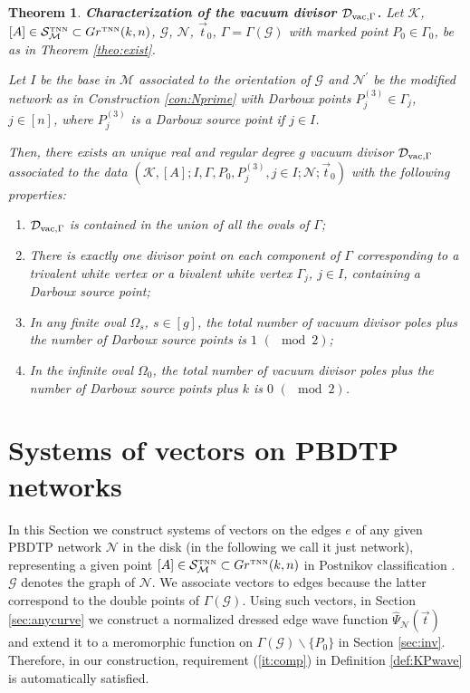 \documentclass[11pt]{amsart}
\theoremstyle{plain}
\numberwithin{equation}{section}
\newtheorem{theorem}{Theorem}[subsection]
\def \GTNN {{Gr^{\mbox{\tiny TNN}} (k,n)}}
\def \DVG {{\mathcal D}_{\textup{\scriptsize vac},\Gamma}}
\def \S {{\mathcal S}_{\mathcal M}^{\mbox{\tiny TNN}}}
\begin{document}
\begin{theorem}\label{theo:vac_div}\textbf{Characterization of the vacuum divisor $\DVG$.} 
Let ${\mathcal K}$, $[A]\in \S\subset \GTNN$, $\mathcal G$, $\mathcal N$, $\vec t_0$, $\Gamma=\Gamma(\mathcal G)$ with marked point $P_0\in \Gamma_0$, be as in Theorem \ref{theo:exist}. 

Let $I$ be the base in $\mathcal M$ associated to the orientation of $\mathcal G$ and $\mathcal N^{\prime}$ be the modified network as in Construction \ref{con:Nprime} with Darboux points $P^{(3)}_j\in \Gamma_j$, $j\in [n]$, where $P^{(3)}_j$ is a Darboux source point if $j\in I$.

Then, there exists an unique real and regular degree $g$ vacuum divisor $\DVG$ associated to the data $({\mathcal K}, [A]; I, \Gamma, P_0, P^{(3)}_{j}, j\in I ; {\mathcal N}; \vec t_0 )$ with the following properties:
\begin{enumerate}
\item $\DVG$ is contained in the union of all the ovals of $\Gamma$; 
\item There is exactly one divisor point on each component of $\Gamma$ corresponding to a trivalent white vertex or a bivalent white vertex $\Gamma_j$, $j\in I$, containing a Darboux source point; 
\item\label{item:defodd} In any finite oval $\Omega_s$, $s\in [g]$, the total number of vacuum divisor poles plus the number of Darboux source points is $1 \,\, (\!\!\!\!\mod 2)$;
\item\label{item:defeven} In the infinite oval $\Omega_0$, the total number of vacuum divisor poles plus the number of Darboux source points plus $k$ is $0 \,\, (\!\!\!\!\mod 2)$.
\end{enumerate}
\end{theorem}

\section{Systems of vectors on PBDTP networks}\label{sec:vectors}

In this Section we construct systems of vectors on the edges $e$ of any given PBDTP network ${\mathcal N}$ in the disk (in the following we call it just network), representing 
a given point $[A]\in{\mathcal S}^{\mbox{\tiny{TNN}}}_{\mathcal M}\subset \GTNN$ in Postnikov classification \cite{Pos}. $\mathcal G$ denotes the graph of $\mathcal N$. 
We associate vectors to edges because the latter correspond to the double points of $\Gamma(\mathcal G)$. Using such vectors, in Section \ref{sec:anycurve} we construct a normalized dressed edge wave function $\hat \Psi_{{\mathcal N}} (\vec t)$ and extend it to a meromorphic function on $\Gamma(\mathcal G)\backslash \{P_0\}$ in Section \ref{sec:inv}. Therefore, in our construction, requirement (\ref{it:comp}) in Definition \ref{def:KPwave} is automatically satisfied. 
\end{document}
